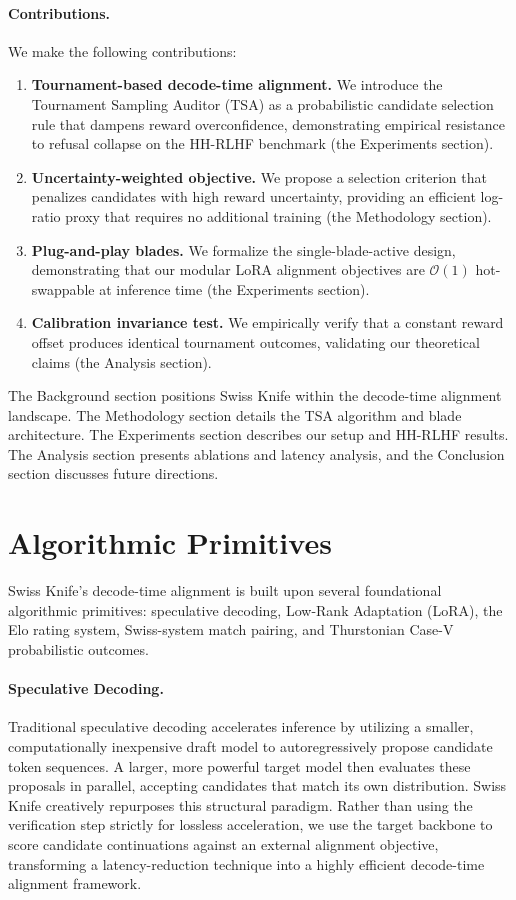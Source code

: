 \documentclass[letterpaper]{article} %
\begin{document}
\paragraph{Contributions.}
We make the following contributions:
\begin{enumerate}
    \item \textbf{Tournament-based decode-time alignment.} We introduce the Tournament Sampling Auditor (TSA) as a probabilistic candidate selection rule that dampens reward overconfidence, demonstrating empirical resistance to refusal collapse on the HH-RLHF benchmark (the Experiments section).
    \item \textbf{Uncertainty-weighted objective.} We propose a selection criterion that penalizes candidates with high reward uncertainty, providing an efficient log-ratio proxy that requires no additional training (the Methodology section).
    \item \textbf{Plug-and-play blades.} We formalize the single-blade-active design, demonstrating that our modular LoRA alignment objectives are $\mathcal{O}(1)$ hot-swappable at inference time (the Experiments section).
    \item \textbf{Calibration invariance test.} We empirically verify that a constant reward offset produces identical tournament outcomes, validating our theoretical claims (the Analysis section).
\end{enumerate}

The Background section positions Swiss Knife within the decode-time alignment landscape. The Methodology section details the TSA algorithm and blade architecture. The Experiments section describes our setup and HH-RLHF results. The Analysis section presents ablations and latency analysis, and the Conclusion section discusses future directions.


\section{Algorithmic Primitives}
Swiss Knife's decode-time alignment is built upon several foundational algorithmic primitives: speculative decoding, Low-Rank Adaptation (LoRA), the Elo rating system, Swiss-system match pairing, and Thurstonian Case-V probabilistic outcomes.

\paragraph{Speculative Decoding.}
Traditional speculative decoding accelerates inference by utilizing a smaller, computationally inexpensive draft model to autoregressively propose candidate token sequences. A larger, more powerful target model then evaluates these proposals in parallel, accepting candidates that match its own distribution. Swiss Knife creatively repurposes this structural paradigm. Rather than using the verification step strictly for lossless acceleration, we use the target backbone to score candidate continuations against an external alignment objective, transforming a latency-reduction technique into a highly efficient decode-time alignment framework.
\end{document}
